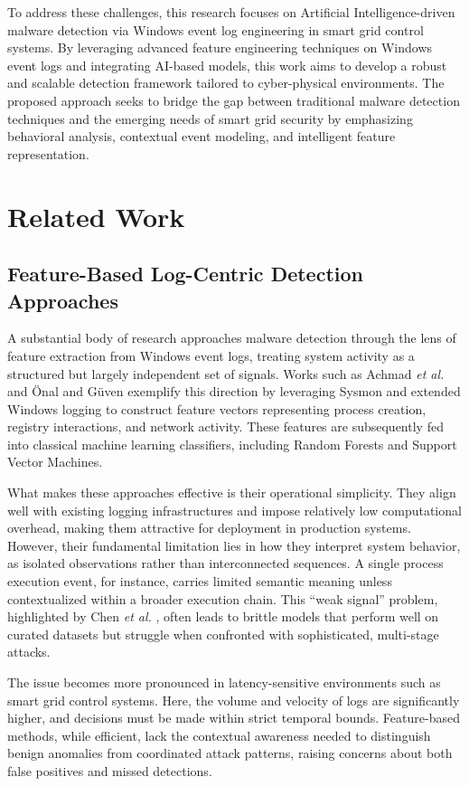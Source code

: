 \documentclass[conference]{IEEEtran}
\begin{document}
To address these challenges, this research focuses on Artificial Intelligence-driven malware detection via Windows event log engineering in smart grid control systems. By leveraging advanced feature engineering techniques on Windows event logs and integrating AI-based models, this work aims to develop a robust and scalable detection framework tailored to cyber-physical environments. The proposed approach seeks to bridge the gap between traditional malware detection techniques and the emerging needs of smart grid security by emphasizing behavioral analysis, contextual event modeling, and intelligent feature representation. 

\section{Related Work}

\subsection{Feature-Based Log-Centric Detection Approaches}

A substantial body of research approaches malware detection through the lens of feature extraction from Windows event logs, treating system activity as a structured but largely independent set of signals. Works such as Achmad \textit{et al.} \cite{achmad2025} and Önal and Güven \cite{onal2025} exemplify this direction by leveraging Sysmon and extended Windows logging to construct feature vectors representing process creation, registry interactions, and network activity. These features are subsequently fed into classical machine learning classifiers, including Random Forests and Support Vector Machines.

What makes these approaches effective is their operational simplicity. They align well with existing logging infrastructures and impose relatively low computational overhead, making them attractive for deployment in production systems. However, their fundamental limitation lies in how they interpret system behavior, as isolated observations rather than interconnected sequences. A single process execution event, for instance, carries limited semantic meaning unless contextualized within a broader execution chain. This ``weak signal'' problem, highlighted by Chen \textit{et al.} \cite{chen2022}, often leads to brittle models that perform well on curated datasets but struggle when confronted with sophisticated, multi-stage attacks.

The issue becomes more pronounced in latency-sensitive environments such as smart grid control systems. Here, the volume and velocity of logs are significantly higher, and decisions must be made within strict temporal bounds. Feature-based methods, while efficient, lack the contextual awareness needed to distinguish benign anomalies from coordinated attack patterns, raising concerns about both false positives and missed detections.
\end{document}

